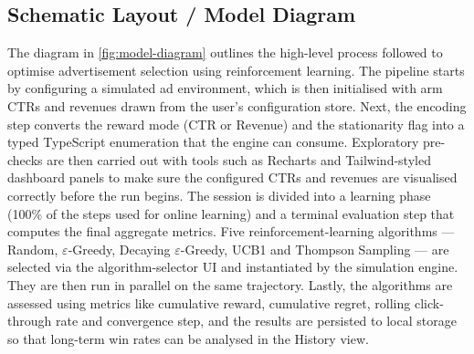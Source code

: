 \subsection{Schematic Layout / Model Diagram}
The diagram in \cref{fig:model-diagram} outlines the high-level process followed to optimise advertisement selection using reinforcement learning. The pipeline starts by configuring a simulated ad environment, which is then initialised with arm CTRs and revenues drawn from the user's configuration store. Next, the encoding step converts the reward mode (CTR or Revenue) and the stationarity flag into a typed TypeScript enumeration that the engine can consume. Exploratory pre-checks are then carried out with tools such as Recharts and Tailwind-styled dashboard panels to make sure the configured CTRs and revenues are visualised correctly before the run begins. The session is divided into a learning phase (100\% of the steps used for online learning) and a terminal evaluation step that computes the final aggregate metrics. Five reinforcement-learning algorithms --- Random, $\varepsilon$-Greedy, Decaying $\varepsilon$-Greedy, UCB1 and Thompson Sampling --- are selected via the algorithm-selector UI and instantiated by the simulation engine. They are then run in parallel on the same trajectory. Lastly, the algorithms are assessed using metrics like cumulative reward, cumulative regret, rolling click-through rate and convergence step, and the results are persisted to local storage so that long-term win rates can be analysed in the History view.

